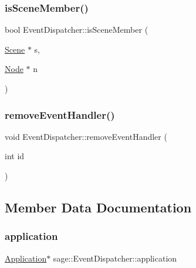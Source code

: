 \subsubsection{\texorpdfstring{isSceneMember()}{isSceneMember()}}
{\footnotesize\ttfamily bool Event\+Dispatcher\+::is\+Scene\+Member (\begin{DoxyParamCaption}\item[{\mbox{\hyperlink{classsage_1_1Scene}{Scene}} $\ast$}]{s,  }\item[{\mbox{\hyperlink{classsage_1_1Node}{Node}} $\ast$}]{n }\end{DoxyParamCaption})\hspace{0.3cm}{\ttfamily [private]}}

\mbox{\label{classsage_1_1EventDispatcher_a79f655113b28c14ee6a86fa5ed7ec238}} 
\subsubsection{\texorpdfstring{removeEventHandler()}{removeEventHandler()}}
{\footnotesize\ttfamily void Event\+Dispatcher\+::remove\+Event\+Handler (\begin{DoxyParamCaption}\item[{int}]{id }\end{DoxyParamCaption})}



\subsection{Member Data Documentation}
\mbox{\label{classsage_1_1EventDispatcher_a0c9ea12254c6806bd4252e0e336e7c81}} 
\subsubsection{\texorpdfstring{application}{application}}
{\footnotesize\ttfamily \mbox{\hyperlink{classsage_1_1Application}{Application}}$\ast$ sage\+::\+Event\+Dispatcher\+::application\hspace{0.3cm}{\ttfamily [private]}}

